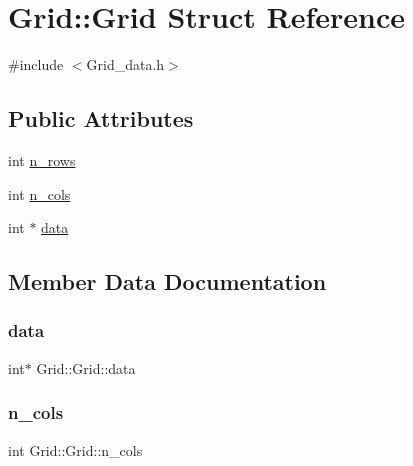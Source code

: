 \hypertarget{struct_grid_1_1_grid}{}\section{Grid\+:\+:Grid Struct Reference}
\label{struct_grid_1_1_grid}


{\ttfamily \#include $<$Grid\+\_\+data.\+h$>$}

\subsection*{Public Attributes}
\begin{DoxyCompactItemize}
\item 
int \mbox{\hyperlink{struct_grid_1_1_grid_a56e06db108e4a1d4c1c11de5e3a3bde6}{n\+\_\+rows}}
\item 
int \mbox{\hyperlink{struct_grid_1_1_grid_a9248cc1521e6dc8983e6621ce47e155a}{n\+\_\+cols}}
\item 
int $\ast$ \mbox{\hyperlink{struct_grid_1_1_grid_a6b4077ea4b34dd552a7d4cae6dc2374c}{data}}
\end{DoxyCompactItemize}


\subsection{Member Data Documentation}
\mbox{\label{struct_grid_1_1_grid_a6b4077ea4b34dd552a7d4cae6dc2374c}} 
\subsubsection{\texorpdfstring{data}{data}}
{\footnotesize\ttfamily int$\ast$ Grid\+::\+Grid\+::data}

\mbox{\label{struct_grid_1_1_grid_a9248cc1521e6dc8983e6621ce47e155a}} 
\subsubsection{\texorpdfstring{n\+\_\+cols}{n\_cols}}
{\footnotesize\ttfamily int Grid\+::\+Grid\+::n\+\_\+cols}

\mbox{\label{struct_grid_1_1_grid_a56e06db108e4a1d4c1c11de5e3a3bde6}} 
